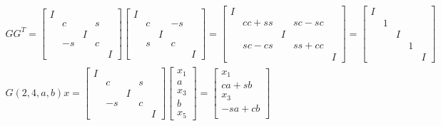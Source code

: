 \documentclass[10pt,a4paper]{article}
\theoremstyle{plain}
\theoremstyle{definition}
\begin{document}
\begin{enumerate}
  \begin{align*}
      GG^T=
      \begin{bmatrix}
        I\\
        & c & & s \\
        &   &I&   \\
        & -s && c \\
        &&&&I
      \end{bmatrix}
      \begin{bmatrix}
        I\\
        & c & & -s \\
        &   &I&   \\
        & s && c \\
        &&&&I
      \end{bmatrix}
      =
      \begin{bmatrix}
        I\\
        & cc+ss & & sc-sc \\
        &   &I&   \\
        & sc-cs && ss+cc \\
        &&&&I
      \end{bmatrix}
      =
      \begin{bmatrix}
        I\\
        & 1 \\
        &   &I&   \\
        & && 1 \\
        &&&&I
      \end{bmatrix} \\
      G(2,4,a,b)x=
      \begin{bmatrix}
        I\\
        & c & & s \\
        &   &I&   \\
        & -s && c \\
        &&&&I
      \end{bmatrix}
      \begin{bmatrix}
        x_1 \\ a \\ x_3 \\ b \\ x_5
      \end{bmatrix}=
      \begin{bmatrix}
        x_1 \\
        ca+sb \\
        x_3 \\
        -sa+cb \\

\end{bmatrix}
\end{align*}
\end{enumerate}
\end{document}
